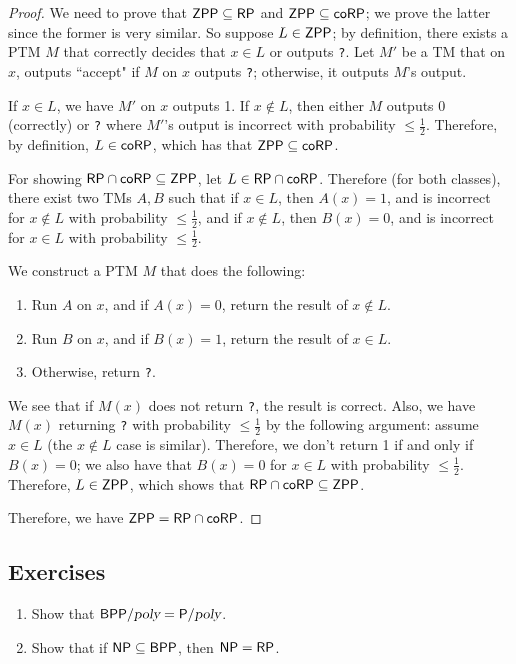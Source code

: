 \begin{proof}
We need to prove that ${\mathsf{ZPP}} \subseteq {\ensuremath{\mathsf{RP}}}$ and ${\mathsf{ZPP}} \subseteq {\ensuremath{\mathsf{coRP}}}$; we prove the latter since the former is very similar. So suppose $L \in {\ensuremath{\mathsf{ZPP}}}$; by definition, there exists a PTM $M$ that correctly decides that $x \in L$ or outputs \texttt{?}. Let $M'$ be a TM that on $x$, outputs ``accept" if $M$ on $x$ outputs \texttt{?}; otherwise, it outputs $M$'s output.

\par If $x \in L$, we have $M'$ on $x$ outputs 1. If $x \notin L$, then either $M$ outputs 0 (correctly) or \texttt{?} where $M'$'s output is incorrect with probability $\le \frac{1}{2}$. Therefore, by definition, $L \in {\ensuremath{\mathsf{coRP}}}$, which has that ${\mathsf{ZPP}} \subseteq {\ensuremath{\mathsf{coRP}}}$.

\par For showing ${\mathsf{RP}} \cap {\ensuremath{\mathsf{coRP}}} \subseteq {\ensuremath{\mathsf{ZPP}}}$, let $L \in {\ensuremath{\mathsf{RP}}} \cap {\ensuremath{\mathsf{coRP}}}$. Therefore (for both classes), there exist two TMs $A, B$ such that if $x \in L$, then $A(x) = 1$, and is incorrect for $x \notin L$ with probability $\le \frac{1}{2}$, and if $x \notin L$, then $B(x) = 0$, and is incorrect for $x \in L$ with probability $\le \frac{1}{2}$. 

\par We construct a PTM $M$ that does the following:
\begin{enumerate}
\item Run $A$ on $x$, and if $A(x) = 0$, return the result of $x \notin L$.
\item Run $B$ on $x$, and if $B(x) = 1$, return the result of $x \in L$. 
\item Otherwise, return \texttt{?}.
\end{enumerate}
We see that if $M(x)$ does not return \texttt{?}, the result is correct. Also, we have $M(x)$ returning \texttt{?} with probability $\le \frac{1}{2}$ by the following argument: assume $x \in L$ (the $x \notin L$ case is similar). Therefore, we don't return 1 if and only if $B(x) = 0$; we also have that $B(x) = 0$ for $x \in L$ with probability $\le \frac{1}{2}$. Therefore, $L \in {\ensuremath{\mathsf{ZPP}}}$, which shows that ${\mathsf{RP}} \cap {\ensuremath{\mathsf{coRP}}} \subseteq {\ensuremath{\mathsf{ZPP}}}$.

\par Therefore, we have ${\mathsf{ZPP}} = {\mathsf{RP}} \cap {\ensuremath{\mathsf{coRP}}}$.  
\end{proof}

\subsection*{Exercises}
\newcommand{\BPPpoly}{\BPP/\poly}
\begin{enumerate}
\item Show that $\BPPpoly = \Ppoly$. %
\item Show that if ${\mathsf{NP}} \subseteq {\ensuremath{\mathsf{BPP}}}$, then ${\mathsf{NP}} = {\mathsf{RP}}$. %
\end{enumerate}